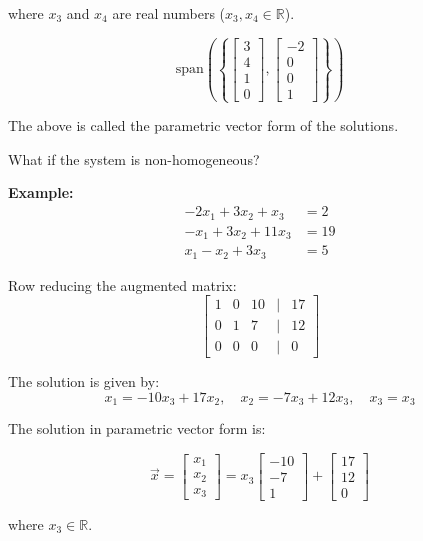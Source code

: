 \documentclass{article}
\begin{document}
where \(x_3\) and \(x_4\) are real numbers (\(x_3, x_4 \in \mathbb{R}\)).


\[
\text{{span}}\left(
\left\{
\begin{bmatrix}
    3 \\
    4 \\
    1 \\
    0
\end{bmatrix},
\begin{bmatrix}
    -2 \\
    0 \\
    0 \\
    1
\end{bmatrix}
\right\}
\right)
\]

The above is called the parametric vector form of the solutions.

What if the system is non-homogeneous?

\textbf{Example:}
\[
\begin{aligned}
    -2x_1 + 3x_2 + x_3 &= 2 \\
    -x_1 + 3x_2 + 11x_3 &= 19 \\
    x_1 - x_2 + 3x_3 &= 5
\end{aligned}
\]

Row reducing the augmented matrix:
\[
\begin{bmatrix}
    1 & 0 & 10 & \vert & 17 \\
    0 & 1 & 7 & \vert & 12 \\
    0 & 0 & 0 & \vert & 0
\end{bmatrix}
\]

The solution is given by:
\[x_1 = -10x_3 + 17x_2, 
\quad x_2 = -7x_3 + 12x_3, 
\quad x_3 = x_3\]

The solution in parametric vector form is:

\[
\vec{x} = 
\begin{bmatrix}
    x_1 \\
    x_2 \\
    x_3 
\end{bmatrix}
= x_3
\begin{bmatrix}
    -10 \\
    -7 \\
    1 
\end{bmatrix}
+
\begin{bmatrix}
    17 \\
    12 \\
    0 
\end{bmatrix}
\]

where \(x_3 \in \mathbb{R}\).
\end{document}
